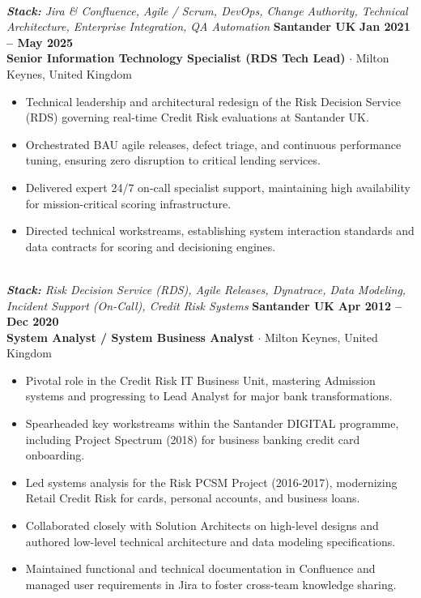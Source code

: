 \documentclass[10pt,a4paper]{article}
\begin{document}
\\\noindent\textit{\footnotesize \textbf{Stack:} Jira \& Confluence, Agile / Scrum, DevOps, Change Authority, Technical Architecture, Enterprise Integration, QA Automation}
\vspace{10pt}
\noindent\textbf{\large Santander UK} \hfill {\color{SynthBlue}\textbf{Jan 2021 -- May 2025}} \\
{\color{SynthPink}\textbf{Senior Information Technology Specialist (RDS Tech Lead)}} $\cdot$ {\color{SlateGray}Milton Keynes, United Kingdom}
\begin{itemize}[leftmargin=1.5em, itemsep=1.5pt, topsep=2pt]
    \item Technical leadership and architectural redesign of the Risk Decision Service (RDS) governing real-time Credit Risk evaluations at Santander UK.
    \item Orchestrated BAU agile releases, defect triage, and continuous performance tuning, ensuring zero disruption to critical lending services.
    \item Delivered expert 24/7 on-call specialist support, maintaining high availability for mission-critical scoring infrastructure.
    \item Directed technical workstreams, establishing system interaction standards and data contracts for scoring and decisioning engines.
\end{itemize}
\\\noindent\textit{\footnotesize \textbf{Stack:} Risk Decision Service (RDS), Agile Releases, Dynatrace, Data Modeling, Incident Support (On-Call), Credit Risk Systems}
\vspace{10pt}
\noindent\textbf{\large Santander UK} \hfill {\color{SynthBlue}\textbf{Apr 2012 -- Dec 2020}} \\
{\color{SynthPink}\textbf{System Analyst / System Business Analyst}} $\cdot$ {\color{SlateGray}Milton Keynes, United Kingdom}
\begin{itemize}[leftmargin=1.5em, itemsep=1.5pt, topsep=2pt]
    \item Pivotal role in the Credit Risk IT Business Unit, mastering Admission systems and progressing to Lead Analyst for major bank transformations.
    \item Spearheaded key workstreams within the Santander DIGITAL programme, including Project Spectrum (2018) for business banking credit card onboarding.
    \item Led systems analysis for the Risk PCSM Project (2016-2017), modernizing Retail Credit Risk for cards, personal accounts, and business loans.
    \item Collaborated closely with Solution Architects on high-level designs and authored low-level technical architecture and data modeling specifications.
    \item Maintained functional and technical documentation in Confluence and managed user requirements in Jira to foster cross-team knowledge sharing.
\end{itemize}
\end{document}
